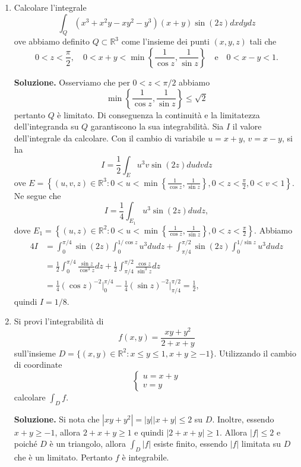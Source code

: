 \begin{enumerate}
	
	\item Calcolare l'integrale
	\[
	\int_Q (x^3 + x^2 y - x y^2 - y^3)(x + y) \sin(2z) dx dy dz
	\]
	ove abbiamo definito $Q \subset \mathbb{R}^3$ come l'insieme dei punti $(x,y,z)$ tali che
	\[
	0 < z < \frac{\pi}{2}, \quad 0 < x + y < \min\left\{\frac{1}{\cos z}, \frac{1}{\sin z}\right\} \quad \text{e} \quad 0 < x - y < 1.
	\]
	
	\textbf{Soluzione.}
		Osserviamo che per $0 < z < \pi/2$ abbiamo
		\[
		\min\left\{\frac{1}{\cos z}, \frac{1}{\sin z}\right\} \leq \sqrt{2}
		\]
		pertanto $Q$ è limitato. Di conseguenza la continuità e la limitatezza dell'integranda su $Q$ garantiscono la sua integrabilità. Sia $I$ il valore dell'integrale da calcolare. Con il cambio di variabile $u = x + y$, $v = x - y$, si ha
		\[
		I = \frac{1}{2} \int_E u^3 v \sin(2z) du dv dz
		\]
		ove $E = \left\{(u,v,z) \in \mathbb{R}^3 : 0 < u < \min\left\{\frac{1}{\cos z}, \frac{1}{\sin z}\right\}, 0 < z < \frac{\pi}{2}, 0 < v < 1\right\}$. Ne segue che
		\[
		I = \frac{1}{4} \int_{E_1} u^3 \sin(2z) du dz,
		\]
		dove $E_1 = \left\{(u,z) \in \mathbb{R}^2 : 0 < u < \min\left\{\frac{1}{\cos z}, \frac{1}{\sin z}\right\}, 0 < z < \frac{\pi}{2}\right\}$. Abbiamo
		\[
		\begin{aligned}
			4I &= \int_0^{\pi/4} \sin(2z) \int_0^{1/\cos z} u^3 du dz + \int_{\pi/4}^{\pi/2} \sin(2z) \int_0^{1/\sin z} u^3 du dz \\
			&= \frac{1}{2} \int_0^{\pi/4} \frac{\sin z}{\cos^3 z} dz + \frac{1}{2} \int_{\pi/4}^{\pi/2} \frac{\cos z}{\sin^3 z} dz \\
			&= \frac{1}{4} (\cos z)^{-2} \bigg|_0^{\pi/4} - \frac{1}{4} (\sin z)^{-2} \bigg|_{\pi/4}^{\pi/2} = \frac{1}{2},
		\end{aligned}
		\]
		quindi $I = 1/8$.
	
	
	\item Si provi l'integrabilità di
	\[
	f(x,y) = \frac{xy + y^2}{2 + x + y}
	\]
	sull'insieme $D = \{(x,y) \in \mathbb{R}^2 : x \leq y \leq 1, x + y \geq -1\}$. Utilizzando il cambio di coordinate
	\[
	\begin{cases}
		u = x + y \\
		v = y
	\end{cases}
	\]
	calcolare $\int_D f$.
	
	\textbf{Soluzione.}
		Si nota che $|xy + y^2| = |y||x + y| \leq 2$ su $D$. Inoltre, essendo $x + y \geq -1$, allora $2 + x + y \geq 1$ e quindi $|2 + x + y| \geq 1$. Allora $|f| \leq 2$ e poiché $D$ è un triangolo, allora $\int_D |f|$ esiste finito, essendo $|f|$ limitata su $D$ che è un limitato. Pertanto $f$ è integrabile.
		

\end{enumerate}
